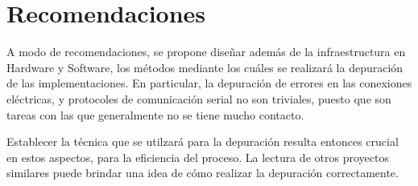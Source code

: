\section{Recomendaciones}

A modo de recomendaciones, se propone diseñar además de la infraestructura en Hardware y Software, los métodos mediante los cuáles se realizará la depuración de las implementaciones. En particular, la depuración de errores en las conexiones eléctricas, y protocoles de comunicación serial no son triviales, puesto que son tareas con las que generalmente no se tiene mucho contacto.

Establecer la técnica que se utilzará para la depuración resulta entonces crucial en estos aspectos, para la eficiencia del proceso. La lectura de otros proyectos similares puede brindar una idea de cómo realizar la depuración correctamente.
